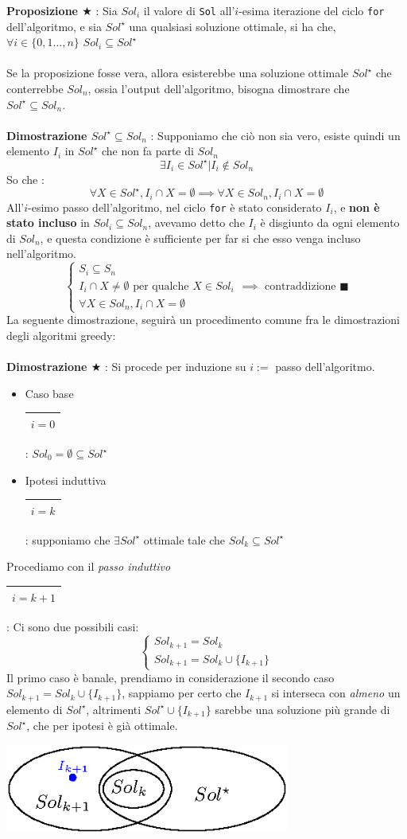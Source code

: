 \documentclass[12pt, letterpaper]{article}
\newcommand{\code}[1]{\colorbox{light-gray}{\texttt{#1}}}
\newcommand{\acc}{\\\hphantom{}\\}
\newcommand{\boxedMath}[1]{\begin{tabular}{|c|}\hline \texttt{#1} \\ \hline\end{tabular} :}
\begin{document}
\textbf{Proposizione $\bigstar$ } : Sia $Sol_i$ il valore di \code{Sol} all'$i$-esima iterazione del ciclo \code{for} 
dell'algoritmo, e sia $Sol^\star$ una qualsiasi soluzione ottimale, si ha che, $\forall i\in \{0,1\dots,n\}$ $Sol_i\subseteq Sol^\star$
\acc 
Se la proposizione fosse vera, allora esisterebbe una soluzione ottimale $Sol^\star$ che conterrebbe $Sol_n$, ossia 
l'output dell'algoritmo, bisogna dimostrare che $Sol^\star \subseteq Sol_n$. \acc 
\textbf{Dimostrazione $Sol^\star \subseteq Sol_n$} : Supponiamo che ciò non sia vero, esiste quindi un 
elemento $I_i$ in $Sol^\star$ che non fa parte di $Sol_n$ $$ \exists I_i\in Sol^\star | I_i\notin Sol_n$$
So che : $$\forall X\in Sol^\star, I_i\cap X = \emptyset\implies \forall X\in Sol_n, I_i\cap X = \emptyset$$
All'$i$-esimo passo dell'algoritmo, nel ciclo \code{for} è stato considerato $I_i$, e \textbf{non è stato incluso} in 
$Sol_i\subseteq Sol_n$, avevamo detto che $I_i$ è disgiunto da ogni elemento di $Sol_n$, e questa condizione è sufficiente 
per far si che esso venga incluso nell'algoritmo. 
$$ \begin{cases}
    S_i\subseteq S_n\\ 
     I_i\cap X \ne \emptyset \text{ per qualche }X\in Sol_i\\
    \forall X\in Sol_n, I_i\cap X = \emptyset
\end{cases}\implies \text{ contraddizione }\blacksquare$$
La seguente dimostrazione, seguirà un procedimento comune fra le dimostrazioni degli algoritmi greedy:\acc 
\textbf{Dimostrazione $\bigstar$} : Si procede per induzione su $i :=$ passo dell'algoritmo.\begin{itemize}
    \item Caso base \boxedMath{$i=0$} $Sol_0 = \emptyset \subseteq Sol^\star$ 
    \item Ipotesi induttiva  \boxedMath{$i=k$} supponiamo che $\exists Sol^\star$ ottimale tale che $Sol_k\subseteq Sol^\star$
\end{itemize}
Procediamo con il \textit{passo induttivo} \boxedMath{$i=k+1$} Ci sono due possibili casi:
 $$\begin{cases}
    Sol_{k+1}=Sol_k\\ 
    Sol_{k+1}=Sol_k \cup \{I_{k+1}\}
\end{cases}$$ 
Il primo caso è banale, prendiamo in considerazione il secondo caso $Sol_{k+1}=Sol_k \cup \{I_{k+1}\}$, sappiamo per certo che 
$I_{k+1}$ si interseca con \textit{almeno} un elemento di $Sol^\star$, altrimenti $Sol^\star\cup \{I_{k+1}\}$ sarebbe una 
soluzione più grande di $Sol^\star$, che per ipotesi è già ottimale.\begin{center}
    \includegraphics[width=0.7\textwidth ]{images/dimPropIntervalli.eps}
\end{center}
\end{document}
